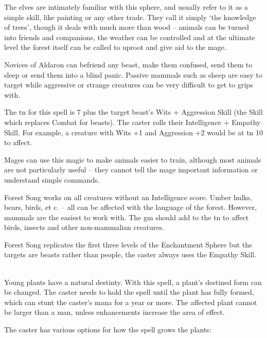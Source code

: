 \begin{multicols}{2}

\noindent
The elves are intimately familiar with this sphere, and usually refer to it as a simple skill, like painting or any other trade. They call it simply `the knowledge of trees', though it deals with much more than wood -- animals can be turned into friends and companions, the weather can be controlled and at the ultimate level the forest itself can be called to uproot and give aid to the mage.

\spelllevel

\label{forestsong}
\noindent
Novices of Aldaron can befriend any beast, make them confused, send them to sleep or send them into a blind panic.
Passive mammals such as sheep are easy to target while aggressive or strange creatures can be very difficult to get to grips with.

The \gls{tn} for this spell is 7 plus the target beast's Wits + Aggression Skill (the Skill which replaces Combat for beasts). The caster rolls their Intelligence + Empathy Skill.
For example, a creature with Wits +1 and Aggression +2 would be at \gls{tn} 10 to affect.

Mages can use this magic to make animals easier to train, although most animals are not particularly useful -- they cannot tell the mage important information or understand simple commands.

Forest Song works on all creatures without an Intelligence score.
Umber hulks, bears, birds, et c. -- all can be affected with the language of the forest.
However, mammals are the easiest to work with.
The \gls{gm} should add to the \gls{tn} to affect birds, insects and other non-mammalian creatures.

Forest Song replicates the first three levels of the Enchantment Sphere but the targets are beasts rather than people, the caster always uses the Empathy Skill.

\\
Young plants have a natural destinty.
With this spell, a plant's destined form can be changed.
The caster needs to hold the spell until the plant has fully formed, which can stunt the caster's mana for a year or more.
The affected plant cannot be larger than a man, unless enhancements increase the area of effect.

The caster has various options for how the spell grows the plants:


\end{multicols}
